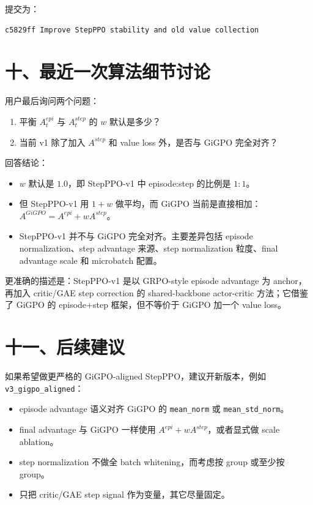 \documentclass[10pt]{ctexart}
\begin{document}
提交为：
\begin{verbatim}
c5829ff Improve StepPPO stability and old value collection
\end{verbatim}

\section*{十、最近一次算法细节讨论}
用户最后询问两个问题：
\begin{enumerate}
\item 平衡 $A_t^{epi}$ 与 $A_t^{step}$ 的 $w$ 默认是多少？
\item 当前 v1 除了加入 $A^{step}$ 和 value loss 外，是否与 GiGPO 完全对齐？
\end{enumerate}

回答结论：
\begin{itemize}
\item $w$ 默认是 $1.0$，即 StepPPO-v1 中 episode:step 的比例是 $1:1$。
\item 但 StepPPO-v1 用 $1+w$ 做平均，而 GiGPO 当前是直接相加：$A^{GiGPO}=A^{epi}+wA^{step}$。
\item StepPPO-v1 并不与 GiGPO 完全对齐。主要差异包括 episode normalization、step advantage 来源、step normalization 粒度、final advantage scale 和 microbatch 配置。
\end{itemize}

更准确的描述是：StepPPO-v1 是以 GRPO-style episode advantage 为 anchor，再加入 critic/GAE step correction 的 shared-backbone actor-critic 方法；它借鉴了 GiGPO 的 episode+step 框架，但不等价于 GiGPO 加一个 value loss。

\section*{十一、后续建议}
如果希望做更严格的 GiGPO-aligned StepPPO，建议开新版本，例如 \texttt{v3\_gigpo\_aligned}：
\begin{itemize}
\item episode advantage 语义对齐 GiGPO 的 \texttt{mean\_norm} 或 \texttt{mean\_std\_norm}。
\item final advantage 与 GiGPO 一样使用 $A^{epi}+wA^{step}$，或者显式做 scale ablation。
\item step normalization 不做全 batch whitening，而考虑按  group 或至少按  group。
\item 只把 critic/GAE step signal 作为变量，其它尽量固定。
\end{itemize}
\end{document}
